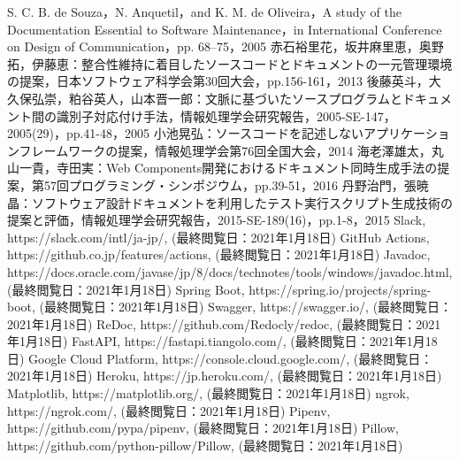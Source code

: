 \begin{thebibliography}{30}
    S. C. B. de Souza，N. Anquetil，and K. M. de Oliveira，A study of the Documentation Essential to Software Maintenance，in International Conference on Design of Communication，pp. 68–75，2005
     赤石裕里花，坂井麻里恵，奥野拓，伊藤恵：整合性維持に着目したソースコードとドキュメントの一元管理環境の提案，日本ソフトウェア科学会第30回大会，pp.156-161，2013
     後藤英斗，大久保弘崇，粕谷英人，山本晋一郎：文脈に基づいたソースプログラムとドキュメント間の識別子対応付け手法，情報処理学会研究報告，2005-SE-147，2005(29)，pp.41-48，2005
     小池晃弘：ソースコードを記述しないアプリケーションフレームワークの提案，情報処理学会第76回全国大会，2014
     海老澤雄太，丸山一貴，寺田実：Web Components開発におけるドキュメント同時生成手法の提案，第57回プログラミング・シンポジウム，pp.39-51，2016
     丹野治門，張暁晶：ソフトウェア設計ドキュメントを利用したテスト実行スクリプト生成技術の提案と評価，情報処理学会研究報告，2015-SE-189(16)，pp.1-8，2015
     Slack, https://slack.com/intl/ja-jp/, (最終閲覧日：2021年1月18日)
     GitHub Actions, https://github.co.jp/features/actions, (最終閲覧日：2021年1月18日)
     Javadoc, https://docs.oracle.com/javase/jp/8/docs/technotes/tools/windows/javadoc.html, (最終閲覧日：2021年1月18日)
     Spring Boot, https://spring.io/projects/spring-boot, (最終閲覧日：2021年1月18日)
     Swagger, https://swagger.io/, (最終閲覧日：2021年1月18日)
     ReDoc, https://github.com/Redocly/redoc, (最終閲覧日：2021年1月18日)
     FastAPI, https://fastapi.tiangolo.com/, (最終閲覧日：2021年1月18日)
     Google Cloud Platform, https://console.cloud.google.com/, (最終閲覧日：2021年1月18日)
     Heroku, https://jp.heroku.com/, (最終閲覧日：2021年1月18日)
     Matplotlib, https://matplotlib.org/, (最終閲覧日：2021年1月18日)
     ngrok, https://ngrok.com/, (最終閲覧日：2021年1月18日)
     Pipenv, https://github.com/pypa/pipenv, (最終閲覧日：2021年1月18日)
     Pillow, https://github.com/python-pillow/Pillow, (最終閲覧日：2021年1月18日)
\end{thebibliography}